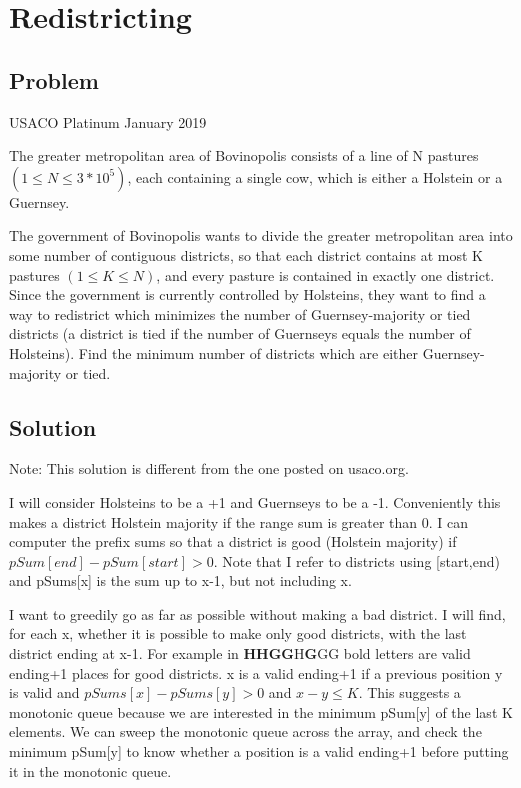 \documentclass{article}
\begin{document}
\section{Redistricting}
\subsection{Problem}
USACO Platinum January 2019

The greater metropolitan area of Bovinopolis consists of a line of N pastures $(1\leq N \leq 3*10^5)$, each containing a single cow, which is either a Holstein or a Guernsey.

The government of Bovinopolis wants to divide the greater metropolitan area into some number of contiguous districts, so that each district contains at most K pastures $(1\leq K\leq N)$, and every pasture is contained in exactly one district. Since the government is currently controlled by Holsteins, they want to find a way to redistrict which minimizes the number of Guernsey-majority or tied districts (a district is tied if the number of Guernseys equals the number of Holsteins). Find the minimum number of districts which are either Guernsey-majority or tied.

\subsection{Solution}
Note: This solution is different from the one posted on usaco.org.

I will consider Holsteins to be a +1 and Guernseys to be a -1. Conveniently this makes a district Holstein majority if the range sum is greater than 0. I can computer the prefix sums so that a district is good (Holstein majority) if $pSum[end]-pSum[start]>0$. Note that I refer to districts using [start,end) and pSums[x] is the sum up to x-1, but not including x.

I want to greedily go as far as possible without making a bad district. I will find, for each x, whether it is possible to make only good districts, with the last district ending at x-1. For example in \textbf{HHGG}H\textbf{G}GG bold letters are valid ending+1 places for good districts. x is a valid ending+1 if a previous position y is valid and $pSums[x]-pSums[y]>0$ and $x-y\leq K$. This suggests a monotonic queue because we are interested in the minimum pSum[y] of the last K elements. We can sweep the monotonic queue across the array, and check the minimum pSum[y] to know whether a position is a valid ending+1 before putting it in the monotonic queue.
\end{document}
